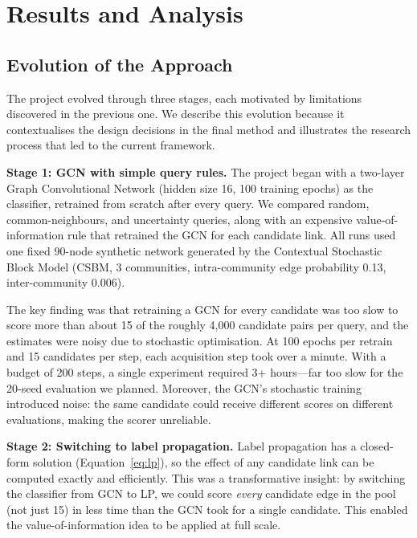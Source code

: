\documentclass[12pt,a4paper,oneside]{report}
\begin{document}
\chapter{Results and Analysis}
\label{ch:results}

\section{Evolution of the Approach}

The project evolved through three stages, each motivated by limitations discovered in the previous one. We describe this evolution because it contextualises the design decisions in the final method and illustrates the research process that led to the current framework.

\textbf{Stage 1: GCN with simple query rules.} The project began with a two-layer Graph Convolutional Network (hidden size 16, 100 training epochs) as the classifier, retrained from scratch after every query. We compared random, common-neighbours, and uncertainty queries, along with an expensive value-of-information rule that retrained the GCN for each candidate link. All runs used one fixed 90-node synthetic network generated by the Contextual Stochastic Block Model (CSBM, 3 communities, intra-community edge probability 0.13, inter-community 0.006).

The key finding was that retraining a GCN for every candidate was too slow to score more than about 15 of the roughly 4,000 candidate pairs per query, and the estimates were noisy due to stochastic optimisation. At 100 epochs per retrain and 15 candidates per step, each acquisition step took over a minute. With a budget of 200 steps, a single experiment required 3+ hours---far too slow for the 20-seed evaluation we planned. Moreover, the GCN's stochastic training introduced noise: the same candidate could receive different scores on different evaluations, making the scorer unreliable.

\textbf{Stage 2: Switching to label propagation.} Label propagation has a closed-form solution (Equation~\ref{eq:lp}), so the effect of any candidate link can be computed exactly and efficiently. This was a transformative insight: by switching the classifier from GCN to LP, we could score \emph{every} candidate edge in the pool (not just 15) in less time than the GCN took for a single candidate. This enabled the value-of-information idea to be applied at full scale.
\end{document}
